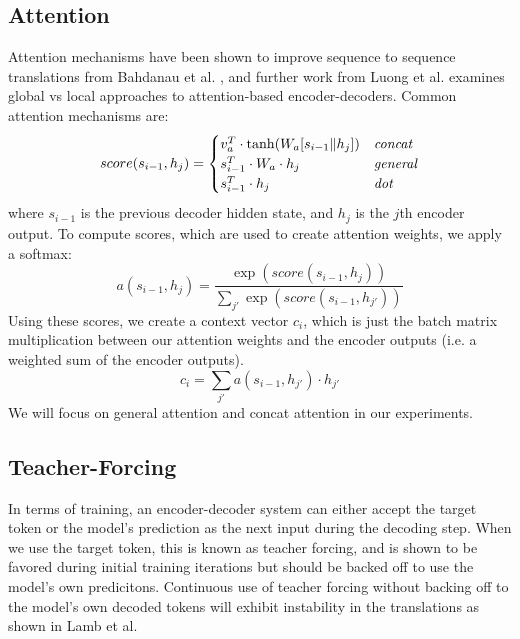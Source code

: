 \documentclass[twoside,twocolumn]{article}
\begin{document}
\subsection{Attention}
Attention mechanisms have been shown to improve sequence to sequence
translations from Bahdanau et al. \cite{bahdanau2014neural}, and further work
from Luong et al. \cite{luong2015effective} examines global vs local approaches
to attention-based encoder-decoders. Common attention mechanisms are:
\begin{equation}
    score(s_{i-1}, h_j) =
    \begin{cases}
        v_a^T \cdot \tanh (W_a [s_{i-1} \| h_j]) & \text{\emph{concat}} \\
        s_{i-1}^T \cdot W_a \cdot h_j & \text{\emph{general}} \\
        s_{i-1}^T \cdot h_j & \text{\emph{dot}} \\
    \end{cases}
\end{equation}
where $s_{i-1}$ is the previous decoder hidden state, and $h_j$ is the $j$th
encoder output.
To compute scores, which are used to create attention weights, we apply a
softmax:
\begin{equation}
  a(s_{i-1}, h_j) = \frac{\exp(score(s_{i-1}, h_j))}{\sum_{j'}\exp(score(s_{i-1}, h_{j'}))}
\end{equation}
Using these scores, we create a context vector $c_i$, which is just the batch
matrix multiplication between our attention weights and the encoder outputs
(i.e. a weighted sum of the encoder outputs).
\begin{equation}
  c_i = \sum_{j'} a(s_{i-1}, h_{j'}) \cdot h_{j'}
\end{equation}
We will focus on general attention and concat attention in our
experiments.
\subsection{Teacher-Forcing}
In terms of training, an encoder-decoder system can either accept the target
token or the model's prediction as the next input during the decoding step.
When we use the target token, this is known as teacher forcing, and is
shown to be favored during initial training iterations but should be backed
off to use the model's own predicitons. Continuous use of teacher forcing
without backing off to the model's own decoded tokens will exhibit instability
in the translations as shown in Lamb et al. \cite{lamb2016professor}
\end{document}
